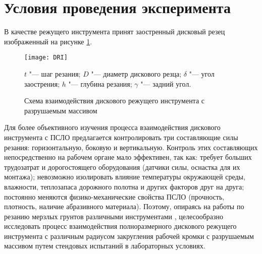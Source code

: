 \section{Условия проведения эксперимента}

	В качестве режущего инструмента принят заостренный дисковый	резец изображенный на рисунке \ref{fig:DRI}.


	\begin{figure}[ht]
		\centering
		\texttt{[image: DRI]}

		$t$ "--- шаг резания; $D$ "--- диаметр дискового резца; $\delta$ "--- угол заострения; $h$ "--- глубина резания; $\gamma$ "--- задний угол. 
		\caption{Схема взаимодействия дискового режущего инструмента с разрушаемым массивом} 
		\label{fig:DRI}  
	\end{figure}
	Для более объективного изучения процесса взаимодействия дискового инструмента с ПСЛО предлагается контролировать три составляющие силы резания: горизонтальную, боковую и вертикальную. Контроль этих составляющих непосредственно на рабочем органе мало эффективен, так как: требует больших трудозатрат и дорогостоящего оборудования (датчики силы, оснастка для их монтажа); невозможно изолировать влияние температуры окружающей среды, влажности, теплозапаса дорожного полотна и других факторов друг на друга; постоянно меняются физико-механические свойства ПСЛО (прочность, плотность, наличие абразивного материала). Поэтому, опираясь на работы по резанию мерзлых грунтов различными инструментами \cite{JelukevichGrunt, BaronTang, BaronShar, Zelenin}, целесообразно исследовать процесс взаимодействия полноразмерного дискового режущего инструмента с различным радиусом закругления рабочей кромки с разрушаемым массивом путем стендовых испытаний в лабораторных условиях.
	
